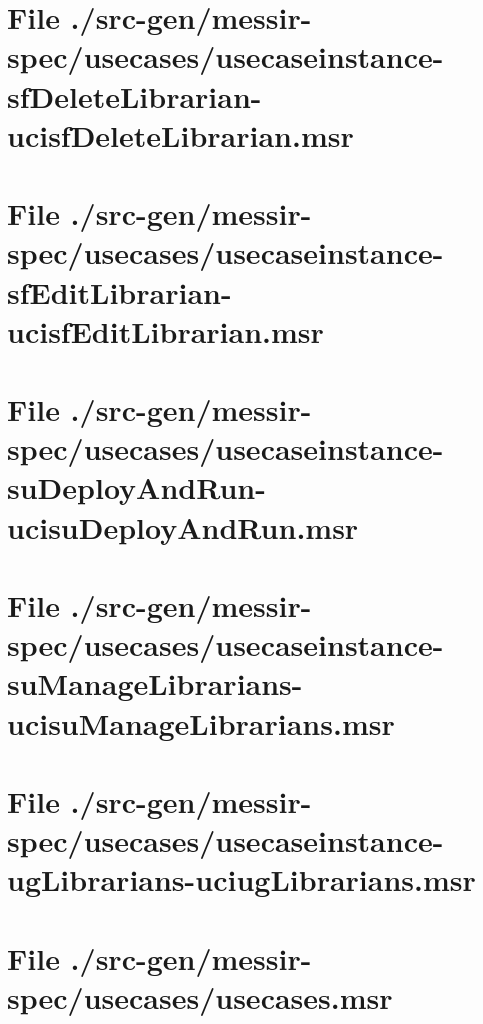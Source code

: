 \section[File /src-gen.../usecaseinstance-sfDeleteLibrarian-ucisfDeleteLibrarian.msr]{File ./src-gen/messir-spec/usecases/usecaseinstance-sfDeleteLibrarian-ucisfDeleteLibrarian.msr}
\scriptsize

\normalsize
	
\section[File /src-gen.../usecaseinstance-sfEditLibrarian-ucisfEditLibrarian.msr]{File ./src-gen/messir-spec/usecases/usecaseinstance-sfEditLibrarian-ucisfEditLibrarian.msr}
\scriptsize

\normalsize
	
\section[File /src-gen.../usecaseinstance-suDeployAndRun-ucisuDeployAndRun.msr]{File ./src-gen/messir-spec/usecases/usecaseinstance-suDeployAndRun-ucisuDeployAndRun.msr}
\scriptsize

\normalsize
	
\section[File /src-gen.../usecaseinstance-suManageLibrarians-ucisuManageLibrarians.msr]{File ./src-gen/messir-spec/usecases/usecaseinstance-suManageLibrarians-ucisuManageLibrarians.msr}
\scriptsize

\normalsize
	
\section[File /src-gen/messir-spec.../usecaseinstance-ugLibrarians-uciugLibrarians.msr]{File ./src-gen/messir-spec/usecases/usecaseinstance-ugLibrarians-uciugLibrarians.msr}
\scriptsize

\normalsize
	
\section[File /src-gen/messir-spec/usecases/usecases.msr]{File ./src-gen/messir-spec/usecases/usecases.msr}
\scriptsize

\normalsize
	
